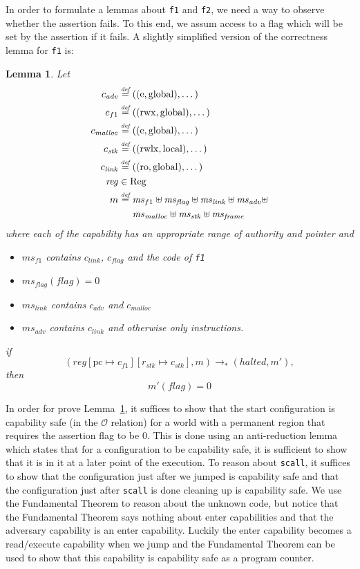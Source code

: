 \documentclass[compsoc,conference,letterpaper,fleqn]{IEEEtran}
\newtheorem{lemma}{Lemma}
\newcommand{\update}[2]{[#1 \mapsto #2]}
\newcommand{\defeq}{\stackrel{\textit{\tiny{def}}}{=}}
\newcommand{\var}[1]{\mathit{#1}}
\newcommand{\hs}{\var{ms}}
\newcommand{\ms}{\hs}
\newcommand{\pcreg}{\mathrm{pc}}
\newcommand{\reg}{\var{reg}}
\newcommand{\adv}{\var{adv}}
\newcommand{\link}{\var{link}}
\newcommand{\stk}{\var{stk}}
\newcommand{\flag}{\var{flag}}
\newcommand{\halted}{\mathit{halted}}
\newcommand{\codelabel}[1]{\mathit{#1}}
\newcommand{\malloc}{\codelabel{malloc}}
\newcommand{\plaindom}[1]{\mathrm{#1}}
\newcommand{\Regs}{\plaindom{Reg}}
\newcommand{\observations}{\mathcal{O}}
\newcommand{\plainperm}[1]{\mathrm{#1}}
\newcommand{\readonly}{\plainperm{ro}}
\newcommand{\entry}{\plainperm{e}}
\newcommand{\rwx}{\plainperm{rwx}}
\newcommand{\rwlx}{\plainperm{rwlx}}
\newcommand{\local}{\plainperm{local}}
\newcommand{\glob}{\plainperm{global}}
\newcommand{\step}[1][]{\rightarrow_{#1}}
\begin{document}
In order to formulate a lemmas about \texttt{f1} and \texttt{f2}, we need a way to observe whether the assertion fails. To this end, we assum access to a flag which will be set by the assertion if it fails. A slightly simplified version of the correctness lemma for \texttt{f1} is:
\begin{lemma}
  \label{lem:correctness-f1}
  Let
  \begin{align*}
    c_{\var{adv}} & \defeq ((\entry,\glob),\dots) \\
    c_{f1} & \defeq ((\rwx,\glob),\dots) \\
    c_\malloc & \defeq ((\entry,\glob),\dots) \\
    c_{\var{stk}} & \defeq ((\rwlx,\local),\dots) \\
    c_\link & \defeq ((\readonly,\glob),\dots)\\
    \reg & \in \Regs \\
    m & \defeq
        \begin{aligned}[t]
          &\hs_{f1} \uplus 
        \hs_\flag \uplus                
        \ms_{\var{link}} \uplus 
        \hs_\adv \uplus \\
        &\ms_{\malloc} \uplus 
        \ms_{\var{stk}} \uplus
        \ms_{\var{frame}}
      \end{aligned}
  \end{align*}
  where each of the capability has an appropriate range of authority and pointer and
  \begin{itemize}
  \item $\ms_{f1}$ contains $c_\link$, $c_\flag$ and the code of \texttt{f1}
  \item $\ms_\flag(\flag) = 0$
  \item $\ms_{\var{link}}$ contains $c_\adv$ and $c_\malloc$
  \item $\hs_\adv$ contains $c_\link$ and otherwise only instructions.
  \end{itemize}
  if 
  \[
    (\reg\update{\pcreg}{c_{f1}}\update{r_\stk}{c_\stk},m) \step[*] (\halted,m'),
  \]
  then
  \[
    m'(\flag) = 0
  \]  
\end{lemma}

In order for prove Lemma~\ref{lem:correctness-f1}, it suffices to show
that the start configuration is capability safe (in the $\observations$ relation) for a
world with a permanent region that requires the assertion flag to be
0. This is done using an anti-reduction lemma which states that for a
configuration to be capability safe, it is sufficient to
show that it is in it at a later point of the execution. To reason
about \texttt{scall}, it suffices to show that the configuration just
after we jumped is capability safe and that the configuration just
after \texttt{scall} is done cleaning up is capability safe.
We use the Fundamental Theorem to reason about the unknown code, but
notice that the Fundamental Theorem says nothing about enter
capabilities and that the adversary capability is an enter
capability. Luckily the enter capability becomes a read/execute
capability when we jump and the Fundamental Theorem can be used to
show that this capability is capability safe as a program counter.
\end{document}
